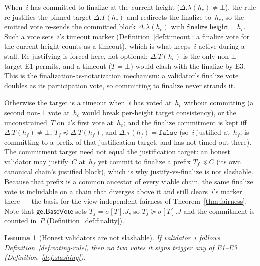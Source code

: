 \ifx\litemode\undefined\documentclass{article}\fi
\newcommand{\finalizeHeight}{\mathsf{finalize\_height}}
\newcommand{\getBaseVote}{\textsf{getBaseVote}\xspace}
\theoremstyle{plain}
\newtheorem{lemma}{Lemma}
\theoremstyle{definition}
\theoremstyle{remark}
\begin{document}
When~$i$ has committed to finalize at the current height ($\Delta.\lambda(h_c) \neq \bot$), the rule re-justifies the pinned target $\Delta.T(h_c)$ and redirects the finalize to~$h_c$, so the emitted vote re-sends the committed block $\Delta.\lambda(h_c)$ with $\finalizeHeight = h_c$.
Such a vote sets~$i$'s timeout marker (Definition~\ref{def:timeout}: a finalize vote for the current height counts as a timeout), which is what keeps~$i$ active during a stall.
Re-justifying is forced here, not optional: $\Delta.T(h_c)$ is the only non-$\bot$ target E1 permits, and a timeout ($T = \bot$) would clash with the finalize by E3.
This is the finalization-as-notarization mechanism: a validator's finalize vote doubles as its participation vote, so committing to finalize never strands it.

Otherwise the target is a timeout when~$i$ has voted at~$h_c$ without committing (a second non-$\bot$ vote at~$h_c$ would break per-height target consistency), or the unconstrained~$T$ on~$i$'s first vote at~$h_c$; and the finalize commitment is kept iff $\Delta.T(h_f) \neq \bot$, $T_f \preceq \Delta.T(h_f)$, and $\Delta.\tau(h_f) = \mathtt{false}$ (so~$i$ justified at~$h_f$, is committing to a prefix of that justification target, and has not timed out there).
The commitment target need not equal the justification target: an honest validator may justify~$C$ at~$h_f$ yet commit to finalize a prefix $T_f \preceq C$ (its own canonical chain's justified block), which is why justify-vs-finalize is not slashable.
Because that prefix is a common ancestor of every viable chain, the same finalize vote is includable on a chain that diverges above it and still clears~$i$'s marker there --- the basis for the view-independent fairness of Theorem~\ref{thm:fairness}.
Note that $\getBaseVote$ sets $T_f = \sigma[T].J$, so $T_f \succeq \sigma[T].J$ and the commitment is counted in~$P$ (Definition~\ref{def:finality}).

\begin{lemma}[Honest validators are not slashable]\label{lem:honest-e1-safety}
If validator~$i$ follows Definition~\ref{def:voting-rule}, then no two votes it signs trigger any of E1--E3 (Definition~\ref{def:slashing}).
\end{lemma}
\end{document}
